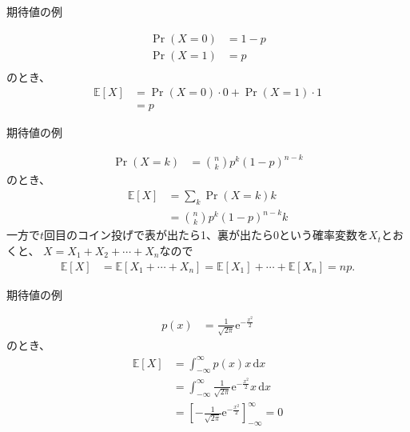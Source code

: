 \documentclass[lualatex,handout]{beamer}
\newcommand{\expt}[1]{\mathbb{E}\left[#1\right]}
\newcommand\dx{{\,\mathrm{d}x}}
\theoremstyle{definition}
\begin{document}
\begin{frame}{期待値の例}
\begin{example}[ベルヌーイ分布]
\begin{align*}
\Pr(X = 0) &= 1-p\\
\Pr(X = 1) &= p\\
\end{align*}
のとき、
\begin{align*}
\expt{X} &= \Pr(X = 0)\cdot 0 + \Pr(X = 1)\cdot 1\\
&= p
\end{align*}
\end{example}

\end{frame}

\begin{frame}{期待値の例}
\begin{example}[二項分布]
\begin{align*}
\Pr(X = k) &= \binom{n}{k} p^k(1-p)^{n-k}
\end{align*}
のとき、
\begin{align*}
\expt{X} &= \sum_k \Pr(X = k) k\\
&= \binom{n}{k} p^k(1-p)^{n-k} k
\end{align*}
一方で$t$回目のコイン投げで表が出たら1、裏が出たら0という確率変数を$X_t$とおくと、
$X=X_1+X_2+\dotsb+X_n$なので
\begin{align*}
\expt{X} &= \expt{X_1+\dotsb+X_n} = \expt{X_1}+\dotsb+\expt{X_n} = np.
\end{align*}
\end{example}
\end{frame}

\begin{frame}{期待値の例}
\begin{example}[標準正規分布]
\begin{align*}
p(x) &= \frac1{\sqrt{2\pi}} \mathrm{e}^{-\frac{x^2}{2}}
\end{align*}
のとき、
\begin{align*}
\expt{X} &= \int_{-\infty}^{\infty} p(x) x\dx\\
&= \int_{-\infty}^\infty \frac1{\sqrt{2\pi}} \mathrm{e}^{-\frac{x^2}{2}} x\dx\\
&=\left[-\frac1{\sqrt{2\pi}} \mathrm{e}^{-\frac{x^2}2}\right]_{-\infty}^\infty = 0
\end{align*}
\end{example}
\end{frame}
\end{document}
